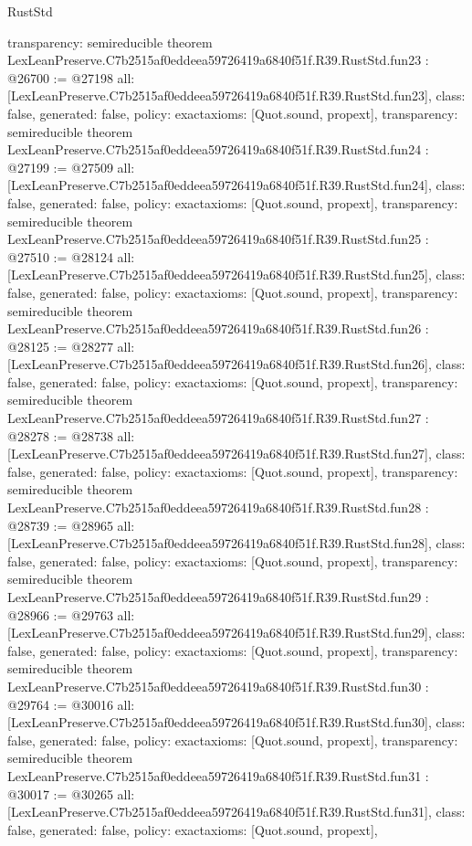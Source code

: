 \begin{lexlean}{RustStd}
\begin{coremodule}
{  transparency: semireducible
}
theorem LexLeanPreserve.C7b2515af0eddeea59726419a6840f51f.R39.RustStd.fun23 : @26700 := @27198 {
  all: [LexLeanPreserve.C7b2515af0eddeea59726419a6840f51f.R39.RustStd.fun23],
  class: false,
  generated: false,
  policy: exact{axioms: [Quot.sound, propext]},
  transparency: semireducible
}
theorem LexLeanPreserve.C7b2515af0eddeea59726419a6840f51f.R39.RustStd.fun24 : @27199 := @27509 {
  all: [LexLeanPreserve.C7b2515af0eddeea59726419a6840f51f.R39.RustStd.fun24],
  class: false,
  generated: false,
  policy: exact{axioms: [Quot.sound, propext]},
  transparency: semireducible
}
theorem LexLeanPreserve.C7b2515af0eddeea59726419a6840f51f.R39.RustStd.fun25 : @27510 := @28124 {
  all: [LexLeanPreserve.C7b2515af0eddeea59726419a6840f51f.R39.RustStd.fun25],
  class: false,
  generated: false,
  policy: exact{axioms: [Quot.sound, propext]},
  transparency: semireducible
}
theorem LexLeanPreserve.C7b2515af0eddeea59726419a6840f51f.R39.RustStd.fun26 : @28125 := @28277 {
  all: [LexLeanPreserve.C7b2515af0eddeea59726419a6840f51f.R39.RustStd.fun26],
  class: false,
  generated: false,
  policy: exact{axioms: [Quot.sound, propext]},
  transparency: semireducible
}
theorem LexLeanPreserve.C7b2515af0eddeea59726419a6840f51f.R39.RustStd.fun27 : @28278 := @28738 {
  all: [LexLeanPreserve.C7b2515af0eddeea59726419a6840f51f.R39.RustStd.fun27],
  class: false,
  generated: false,
  policy: exact{axioms: [Quot.sound, propext]},
  transparency: semireducible
}
theorem LexLeanPreserve.C7b2515af0eddeea59726419a6840f51f.R39.RustStd.fun28 : @28739 := @28965 {
  all: [LexLeanPreserve.C7b2515af0eddeea59726419a6840f51f.R39.RustStd.fun28],
  class: false,
  generated: false,
  policy: exact{axioms: [Quot.sound, propext]},
  transparency: semireducible
}
theorem LexLeanPreserve.C7b2515af0eddeea59726419a6840f51f.R39.RustStd.fun29 : @28966 := @29763 {
  all: [LexLeanPreserve.C7b2515af0eddeea59726419a6840f51f.R39.RustStd.fun29],
  class: false,
  generated: false,
  policy: exact{axioms: [Quot.sound, propext]},
  transparency: semireducible
}
theorem LexLeanPreserve.C7b2515af0eddeea59726419a6840f51f.R39.RustStd.fun30 : @29764 := @30016 {
  all: [LexLeanPreserve.C7b2515af0eddeea59726419a6840f51f.R39.RustStd.fun30],
  class: false,
  generated: false,
  policy: exact{axioms: [Quot.sound, propext]},
  transparency: semireducible
}
theorem LexLeanPreserve.C7b2515af0eddeea59726419a6840f51f.R39.RustStd.fun31 : @30017 := @30265 {
  all: [LexLeanPreserve.C7b2515af0eddeea59726419a6840f51f.R39.RustStd.fun31],
  class: false,
  generated: false,
  policy: exact{axioms: [Quot.sound, propext]},
}
\end{coremodule}
\end{lexlean}
